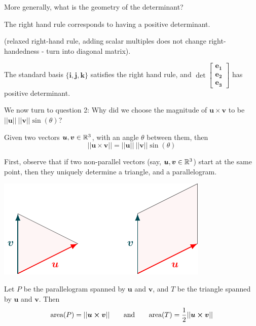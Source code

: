 More generally, what is the geometry of the determinant?

    \begin{proposition}
        The right hand rule corresponds to having a positive determinant.
    \end{proposition}

 (relaxed right-hand rule, adding scalar multiples does not change right-handedness - turn into diagonal matrix).

\begin{example}
    The standard basis $\{\bm{i}, \bm{j}, \bm{k}\}$ satisfies the right hand rule, and $\det\begin{bmatrix}
\bm{e_1}\\
    \bm{e_2}  \\
    \bm{e_3}
\end{bmatrix}$ has positive determinant.
\end{example}


We now turn to question 2: Why did we choose the  magnitude of $\bm{u \times v}$ to be $||\bm{u}|| \ ||\bm{v}|| \sin(\theta)$?

\begin{proposition}\label{crossprodmagnitudeexp}
        Given two vectors $\bm{u}, \bm{v} \in \mathbb{R}^3$, with an angle $\theta$ between them, then $$||\bm{u \times v}|| = ||\bm{u}|| \ ||\bm{v}|| \sin(\theta)$$
    \end{proposition}
    
First, observe that if two non-parallel vectors (say, $\bm{u}, \bm{v} \in \mathbb{R}^3$) start at the same point, then they uniquely determine a triangle, and a parallelogram.
 \begin{center}        
        \includegraphics{chapters/1-LinearAlgebra/figures/figures-triangleparallelogram.pdf}
    \end{center}

\begin{theorem}
    Let $P$ be the parallelogram spanned by $\bm{u}$ and $\bm{v}$, and $T$ be the triangle spanned by $\bm{u}$ and $\bm{v}$. Then
    $$\textnormal{area}(P) =  ||\bm{u \times v}|| \qquad \textnormal{and} \qquad \textnormal{area}(T) = \frac{1}{2}||\bm{u \times v}||$$
\end{theorem}

